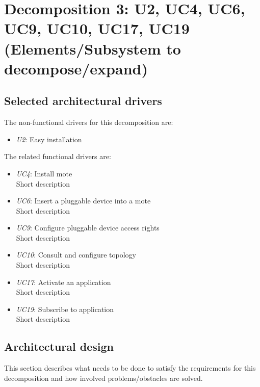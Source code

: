 \section{Decomposition 3: U2, UC4, UC6, UC9, UC10, UC17, UC19 (Elements/Subsystem to decompose/expand)}


\subsection{Selected architectural drivers}
    The non-functional drivers for this decomposition are:
    \begin{itemize}
    	\item \emph{U2}: Easy installation
    \end{itemize}

    The related functional drivers are:
    \begin{itemize}
        \item \emph{UC4}: Install mote \\
              Short description
        \item \emph{UC6}: Insert a pluggable device into a mote \\
              Short description
        \item \emph{UC9}: Configure pluggable device access rights \\
              Short description
        \item \emph{UC10}: Consult and configure topology \\
              Short description
        \item \emph{UC17}: Activate an application \\
              Short description
        \item \emph{UC19}: Subscribe to application \\
              Short description
    \end{itemize}


\subsection{Architectural design}
    This section describes what needs to be done to satisfy the requirements for
    this decomposition and how involved problems/obstacles are solved.

